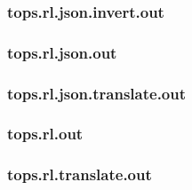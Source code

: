 \subsubsection{tops.rl.json.invert.out}
\label{app:tops_rl.json.invert.out}

\subsubsection{tops.rl.json.out}
\label{app:tops_rl.json.out}

\subsubsection{tops.rl.json.translate.out}
\label{app:tops_rl.json.translate.out}

\subsubsection{tops.rl.out}
\label{app:tops_rl.out}

\subsubsection{tops.rl.translate.out}
\label{app:tops_rl.translate.out}

